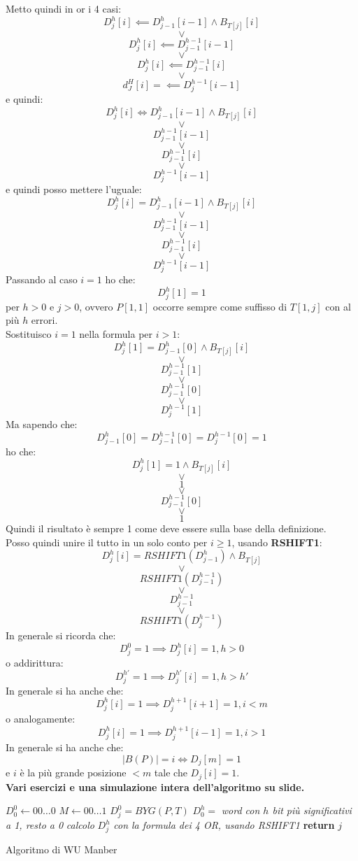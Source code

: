 Metto quindi in or i 4 casi:
\[D_j^h[i]\impliedby D_{j-1}^h[i-1]\land B_{T[j]}[i]\]
\[\lor\]
\[D_j^h[i]\impliedby D_{j-1}^{h-1}[i-1] \]
\[\lor\]
\[D^h_j[i]  \impliedby D_{j-1}^{h-1}[i]\]
\[\lor\]
\[d_J^H[i]=\impliedby D_j^{h-1}[i-1]\]
e quindi:
\[D_j^h[i]\iff D_{j-1}^h[i-1]\land B_{T[j]}[i]\]
\[\lor\]
\[D_{j-1}^{h-1}[i-1] \]
\[\lor\]
\[ D_{j-1}^{h-1}[i]\]
\[\lor\]
\[ D_j^{h-1}[i-1]\]
e quindi posso mettere l'uguale:
\[D_j^h[i]= D_{j-1}^h[i-1]\land B_{T[j]}[i]\]
\[\lor\]
\[D_{j-1}^{h-1}[i-1] \]
\[\lor\]
\[ D_{j-1}^{h-1}[i]\]
\[\lor\]
\[ D_j^{h-1}[i-1]\]
Passando al caso $i=1$ ho che:
\[D_j^h[1]=1\]
per $h>0$ e $j>0$, ovvero $P[1,1]$ occorre sempre come suffisso di $T[1,j]$ con
al più $h$ errori.\\
Sostituisco $i=1$ nella formula per $i>1$:
\[D_j^h[1]= D_{j-1}^h[0]\land B_{T[j]}[i]\]
\[\lor\]
\[D_{j-1}^{h-1}[1] \]
\[\lor\]
\[ D_{j-1}^{h-1}[0]\]
\[\lor\]
\[ D_j^{h-1}[1]\]
Ma sapendo che:
\[D_{j-1}^h[0]=D_{j-1}^{h-1}[0]=D_j^{h-1}[0]=1\]
ho che:
\[D_j^h[1]=1\land B_{T[j]}[i]\]
\[\lor\]
\[1 \]
\[\lor\]
\[ D_{j-1}^{h-1}[0]\]
\[\lor\]
\[ 1\]
Quindi il risultato è sempre 1 come deve essere sulla base della definizione.\\
Posso quindi unire il tutto in un solo conto per $i\geq 1$,
usando \textbf{RSHIFT1}:
\[D_j^h[i]=  RSHIFT1(D_{j-1}^h)\land B_{T[j]}\]
\[\lor\]
\[ RSHIFT1(D_{j-1}^{h-1})\]
\[\lor\]
\[D_{j-1}^{h-1}\]
\[\lor\]
\[ RSHIFT1(D_j^{h-1})\]
In generale si ricorda che:
\[D^0_j=1\implies D_j^h[i]=1,h>0\]
o addirittura:
\[D^{h'}_j=1\implies D_j^{h'}[i]=1,h>h'\]
In generale si ha anche che:
\[D_j^h[i]=1\implies D_j^{h+1}[i+1]=1, i< m\]
o analogamente:
\[D_j^h[i]=1\implies D_j^{h+1}[i-1]=1, i>1\]
In generale si ha anche che:
\[|B(P)|=i\iff D_j[m]=1\]
e $i$ è la più grande posizione $<m$ tale che $D_j[i]=1$.\\
\textbf{Vari esercizi e una simulazione intera dell'algoritmo su slide.}
\begin{algorithm}
  \begin{algorithmic}
    \State $D_0^0\gets 00\ldots 0$
    \State $M\gets 00\ldots 1$
    \State $D_j^0=BYG(P,T)$
    \State $D_0^h=$\textit{ word con $h$ bit più significativi a 1, resto a 0}
    \State \textit{calcolo} $D_j^h$ \textit{con la formula dei 4 OR, usando
    RSHIFT1} 
    \State \textbf{return} $j$
    \EndIf
    \EndFor
    \EndFor
    \EndFunction
  \end{algorithmic}
  \caption{Algoritmo di WU Manber}
\end{algorithm}